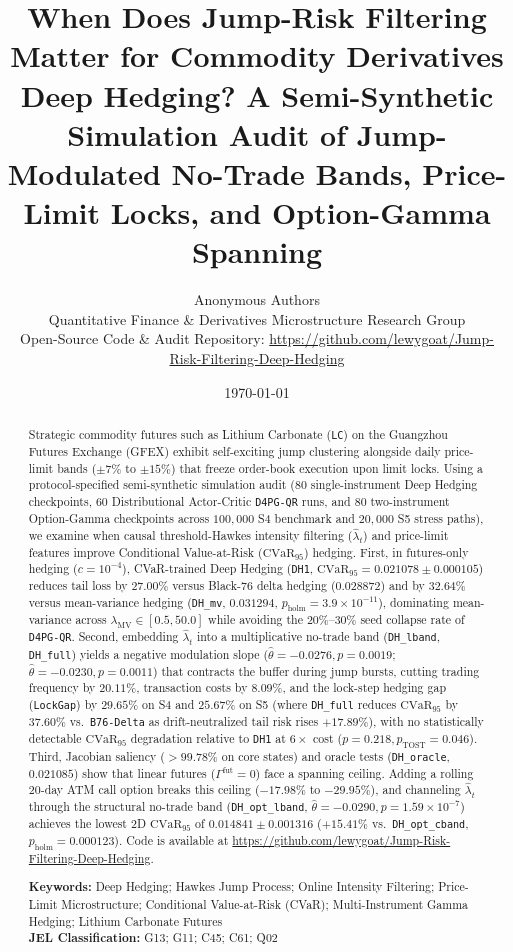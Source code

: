 \documentclass[11pt,a4paper]{article}
\title{\textbf{When Does Jump-Risk Filtering Matter for Commodity Derivatives Deep Hedging? A Semi-Synthetic Simulation Audit of Jump-Modulated No-Trade Bands, Price-Limit Locks, and Option-Gamma Spanning}}
\author{
  Anonymous Authors\\[0.3em]
  \small Quantitative Finance \& Derivatives Microstructure Research Group\\
  \small Open-Source Code \& Audit Repository: \url{https://github.com/lewygoat/Jump-Risk-Filtering-Deep-Hedging}
}
\date{\today}
\begin{document}
\maketitle

\begin{abstract}
\noindent
Strategic commodity futures such as Lithium Carbonate (\texttt{LC}) on the Guangzhou Futures Exchange (GFEX) exhibit self-exciting jump clustering alongside daily price-limit bands ($\pm 7\%$ to $\pm 15\%$) that freeze order-book execution upon limit locks. Using a protocol-specified semi-synthetic simulation audit ($80$ single-instrument Deep Hedging checkpoints, $60$ Distributional Actor-Critic \texttt{D4PG-QR} runs, and $80$ two-instrument Option-Gamma checkpoints across $100,000$ S4 benchmark and $20,000$ S5 stress paths), we examine when causal threshold-Hawkes intensity filtering ($\hat{\lambda}_t$) and price-limit features improve Conditional Value-at-Risk ($\text{CVaR}_{95}$) hedging. First, in futures-only hedging ($c = 10^{-4}$), CVaR-trained Deep Hedging (\texttt{DH1}, $\text{CVaR}_{95} = 0.021078 \pm 0.000105$) reduces tail loss by $27.00\%$ versus Black-76 delta hedging ($0.028872$) and by $32.64\%$ versus mean-variance hedging (\texttt{DH\_mv}, $0.031294$, $p_{\text{holm}} = 3.9 \times 10^{-11}$), dominating mean-variance across $\lambda_{\text{MV}} \in [0.5, 50.0]$ while avoiding the $20\%\text{--}30\%$ seed collapse rate of \texttt{D4PG-QR}. Second, embedding $\hat{\lambda}_t$ into a multiplicative no-trade band (\texttt{DH\_lband}, \texttt{DH\_full}) yields a negative modulation slope ($\hat{\theta} = -0.0276, p = 0.0019$; $\hat{\theta} = -0.0230, p = 0.0011$) that contracts the buffer during jump bursts, cutting trading frequency by $20.11\%$, transaction costs by $8.09\%$, and the lock-step hedging gap (\texttt{LockGap}) by $29.65\%$ on S4 and $25.67\%$ on S5 (where \texttt{DH\_full} reduces $\text{CVaR}_{95}$ by $37.60\%$ vs.\ \texttt{B76-Delta} as drift-neutralized tail risk rises $+17.89\%$), with no statistically detectable $\text{CVaR}_{95}$ degradation relative to \texttt{DH1} at $6\times$ cost ($p = 0.218, p_{\text{TOST}} = 0.046$). Third, Jacobian saliency ($>99.78\%$ on core states) and oracle tests (\texttt{DH\_oracle}, $0.021085$) show that linear futures ($\Gamma^{\text{fut}} = 0$) face a spanning ceiling. Adding a rolling 20-day ATM call option breaks this ceiling ($-17.98\%$ to $-29.95\%$), and channeling $\hat{\lambda}_t$ through the structural no-trade band (\texttt{DH\_opt\_lband}, $\hat{\theta} = -0.0290, p = 1.59 \times 10^{-7}$) achieves the lowest 2D $\text{CVaR}_{95}$ of $0.014841 \pm 0.001316$ ($+15.41\%$ vs.\ \texttt{DH\_opt\_cband}, $p_{\text{holm}} = 0.000123$). Code is available at \url{https://github.com/lewygoat/Jump-Risk-Filtering-Deep-Hedging}.

\vspace{0.6em}
\noindent\textbf{Keywords:} Deep Hedging; Hawkes Jump Process; Online Intensity Filtering; Price-Limit Microstructure; Conditional Value-at-Risk (CVaR); Multi-Instrument Gamma Hedging; Lithium Carbonate Futures\\[0.3em]
\noindent\textbf{JEL Classification:} G13; G11; C45; C61; Q02
\end{abstract}
\end{document}
